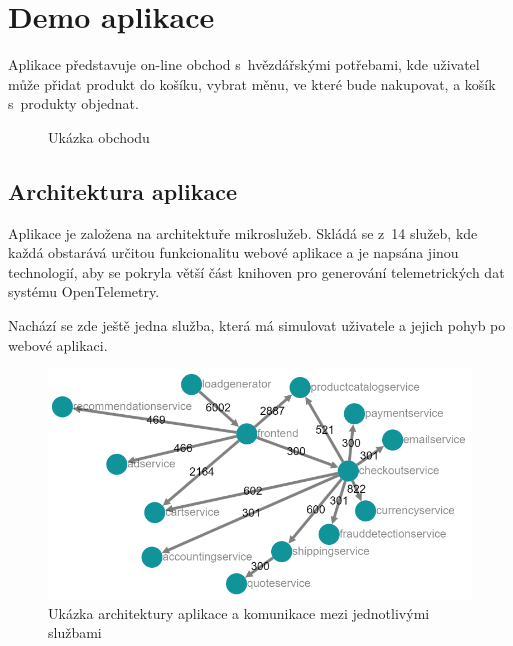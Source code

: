 \section{Demo aplikace}
Aplikace představuje on-line obchod s~hvězdářskými potřebami, kde uživatel může přidat produkt do košíku, vybrat měnu, ve které bude nakupovat, a košík s~produkty objednat.


\begin{figure}[H]%
    \centering
    \qquad
    \caption{Ukázka obchodu}%
    \label{fig:example}%
\end{figure}

\subsection{Architektura aplikace}
Aplikace je založena na architektuře mikroslužeb. Skládá se z~14 služeb, kde každá obstarává určitou funkcionalitu webové aplikace a je napsána jinou technologií, aby se pokryla větší část knihoven pro generování telemetrických dat systému OpenTelemetry.

Nachází se zde ještě jedna služba, která má simulovat uživatele a jejich pohyb po webové aplikaci.

\begin{figure}[H]
  \centering
  \includegraphics[width=15cm]{obrazky-figures/demoArchitecture.png}
  \caption{Ukázka architektury aplikace a komunikace mezi jednotlivými službami}
  \label{fig:demoArchitecture}
\end{figure}

